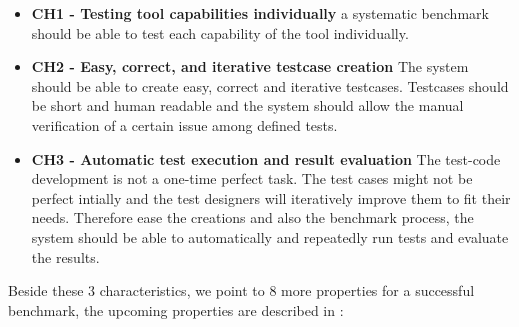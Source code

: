 \documentclass[authoryear,preprint]{sigplanconf}
\begin{document}
\begin{itemize}
	\item \textbf{CH1 - Testing tool capabilities individually} a systematic benchmark should be able to test each capability of the tool individually. 
	\item \textbf{CH2 - Easy, correct, and iterative testcase creation} The system should be able to create easy, correct and iterative testcases. Testcases should be short and human readable and the system should allow the manual verification of a certain issue among defined tests. 
	\item \textbf{CH3 - Automatic test execution and result evaluation} The test-code development is not a one-time perfect task. The test cases might not be perfect intially and the test designers will iteratively improve them to fit their needs. Therefore ease the creations and also the benchmark process, the system should be able to automatically and repeatedly run tests and evaluate the results. 
\end{itemize}

Beside these 3 characteristics, we point to 8 more properties for a successful benchmark, the upcoming properties are described in \cite{sim2003}:
\end{document}
